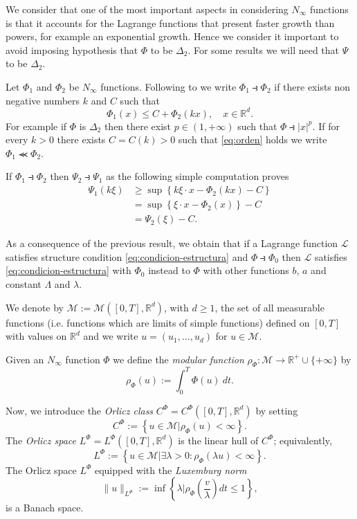 \documentclass[twoside]{article}
\theoremstyle{remark}
\newcommand{\orlnor}{\|_{L^{\Phi}}}
\newcommand{\lphi}{L^{\Phi}}
\newcommand{\claseor}{C^{\Phi}}
\newcommand{\rr}{\mathbb{R}}
\renewcommand{\leq}{\leqslant}
\renewcommand{\geq}{\geqslant}
\newcounter{example}[section]
\begin{document}
We consider that one of the most important aspects in considering $N_{\infty}$ functions is that it accounts for the Lagrange functions that present faster growth than powers, for example an exponential growth. Hence we consider it important to avoid imposing hypothesis that $\Phi$ to be $\Delta_2$. For some results we will need that $\Psi$ to be $\Delta_2$. 


Let $\Phi_1$ and $\Phi_2$ be   $N_{\infty}$ functions. Following to \cite{trudinger1974imbedding} we write $\Phi_1\strictif\Phi_2$ if there exists non negative numbers $k$ and $C$ such that
\begin{equation}\label{eq:orden} \Phi_1(x)\leq C+\Phi_2(kx),\quad x\in\rr^d.\end{equation}
For example if $\Phi$ is $\Delta_2$ then there exist $p\in (1,+\infty)$ such that $\Phi\strictif |x|^p$.  If for every $k>0$ there exists $C=C(k)>0$ such that \eqref{eq:orden} holds we write  $\Phi_1\llcurly\Phi_2$. 

If $\Phi_1\strictif \Phi_2$ then $\Psi_2\strictif\Psi_1$ as the following simple computation proves 
\[
\begin{split}
  \Psi_1(k\xi)&\geq \sup \left\{k\xi\cdot x-\Phi_2(kx)-C\right\}\\
&=\sup \left\{\xi\cdot x-\Phi_2(x)\right\}-C\\
&=\Psi_2\left(\xi\right)-C.
\end{split}
\]


As a consequence of the previous result, we obtain that if a Lagrange function $\mathcal{L}$ satisfies structure condition \eqref{eq:condicion-estructura} and $\Phi\strictif \Phi_0$ then $\mathcal{L}$ satisfies \eqref{eq:condicion-estructura} with $\Phi_0$ instead to $\Phi$ with other functions $b$, $a$ and constant $\Lambda$ and $\lambda$.  





 We denote by $\mathcal{M}:=\mathcal{M}\left([0,T],\rr^d\right)$, with $d\geq 1$,  the set of all measurable functions (i.e. functions which are limits of simple functions)  defined on $[0,T]$ with values on $\mathbb{R}^d$ and  we write $u=(u_1,\dots,u_d)$ for  $u\in \mathcal{M}$.

 Given  an $N_{\infty}$ function $\Phi$ we define the \emph{modular function} 
$\rho_{\Phi}:\mathcal{M}\to \mathbb{R}^+\cup\{+\infty\}$ by
\[\rho_{\Phi}(u):= \int_0^T \Phi(u)\ dt.\]

Now, we introduce the \emph{Orlicz class} $C^{\Phi}=C^{\Phi}\left([0,T],\rr^d\right)$   by setting
\begin{equation}\label{claseOrlicz}
  C^{\Phi}:=\left\{u\in \mathcal{M} | \rho_{\Phi}(u)< \infty \right\}.
\end{equation}
The \emph{Orlicz space} $\lphi=L^{\Phi}\left([0,T],\rr^d\right)$ is the linear hull of $\claseor$;
equivalently,
\begin{equation}\label{espacioOrlicz}
\lphi:=\left\{ u\in \mathcal{M}| \exists \lambda>0: \rho_{\Phi}(\lambda u) < \infty   \right\}.
\end{equation}
  The Orlicz space $\lphi$ equipped with the \emph{Luxemburg norm}
\[
\|  u  \orlnor:=\inf \left\{ \lambda\bigg| \rho_{\Phi}\left(\frac{v}{\lambda}\right) dt\leq 1\right\},
\]
is a Banach space. 
\end{document}
